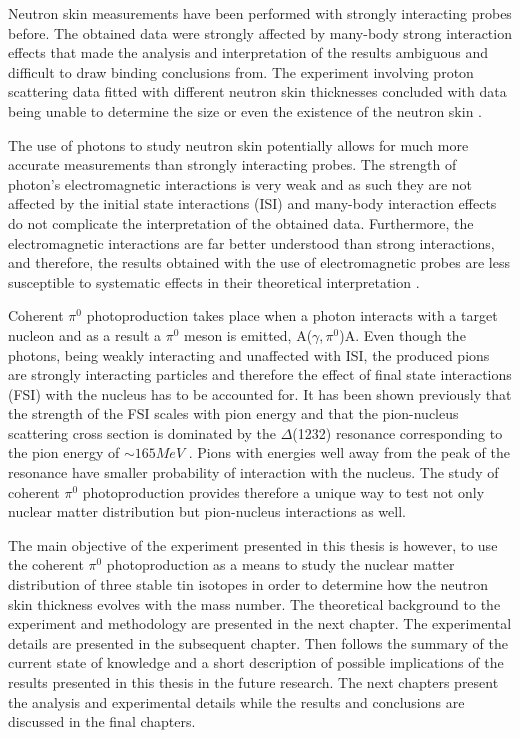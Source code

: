 \indent Neutron skin measurements have been performed with strongly interacting probes before. The obtained data were strongly affected by many-body strong interaction effects that made the analysis and interpretation of the results ambiguous and difficult to draw binding conclusions from. The experiment involving proton scattering data fitted with different neutron skin thicknesses concluded with data being unable to determine the size or even the existence of the neutron skin \cite{pike}.

\indent The use of photons to study neutron skin potentially allows for much more accurate measurements than strongly interacting probes. The strength of photon's electromagnetic interactions is very weak and as such they are not affected by the initial state interactions (ISI) and many-body interaction effects do not complicate the interpretation of the obtained data. Furthermore, the electromagnetic interactions are far better understood than strong interactions, and therefore, the results obtained with the use of electromagnetic probes are less susceptible to systematic effects in their theoretical interpretation \cite{claire}.

\indent Coherent $\pi^{0}$ photoproduction takes place when a photon interacts with a target nucleon and as a result a $\pi^{0}$ meson is emitted, A($\gamma,\pi^{0}$)A. Even though the photons, being weakly interacting and unaffected with ISI, the produced pions are strongly interacting particles and therefore the effect of final state interactions (FSI) with the nucleus has to be accounted for. It has been shown previously that the strength of the FSI scales with pion energy and that the pion-nucleus scattering cross section is dominated by the $\Delta$(1232) resonance corresponding to the pion energy of $\sim165MeV$ . Pions with energies well away from the peak of the resonance have smaller probability of interaction with the nucleus. The study of coherent $\pi^{0}$ photoproduction provides therefore a unique way to test not only nuclear matter distribution but pion-nucleus interactions as well.

\indent The main objective of the experiment presented in this thesis is however, to use the coherent $\pi^{0}$ photoproduction as a means to study the nuclear matter distribution of three stable tin isotopes in order to determine how the neutron skin thickness evolves with the mass number. The theoretical background to the experiment and methodology are presented in the next chapter. The experimental details are presented in the subsequent chapter. Then follows the summary of the current state of knowledge and a short description of possible implications of the results presented in this thesis in the future research. The next chapters present the analysis and experimental details while the results and conclusions are discussed in the final chapters.
